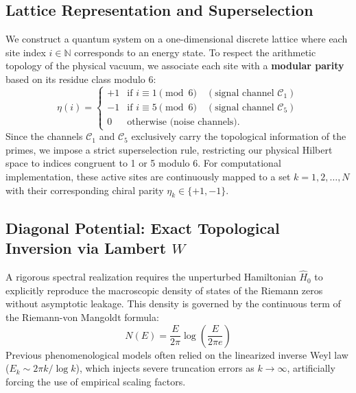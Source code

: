 \documentclass[prl,aps,floatfix,superscriptaddress,10pt]{revtex4-2}
\begin{document}
\subsection{Lattice Representation and Superselection}

We construct a quantum system on a one-dimensional discrete lattice where each site index $i \in \mathbb{N}$ corresponds to an energy state. To respect the arithmetic topology of the physical vacuum, we associate each site with a \textbf{modular parity} based on its residue class modulo 6:
\begin{equation}
\eta(i) = \begin{cases}
+1 & \text{if } i \equiv 1 \pmod 6 \quad (\text{signal channel } \mathcal{C}_1)\\
-1 & \text{if } i \equiv 5 \pmod 6 \quad (\text{signal channel } \mathcal{C}_5)\\
0 & \text{otherwise (noise channels)}.
\end{cases}
\end{equation}
Since the channels $\mathcal{C}_1$ and $\mathcal{C}_5$ exclusively carry the topological information of the primes, we impose a strict superselection rule, restricting our physical Hilbert space to indices congruent to 1 or 5 modulo 6. For computational implementation, these active sites are continuously mapped to a set $k = 1,2,\dots,N$ with their corresponding chiral parity $\eta_k \in \{+1,-1\}$.

\subsection{Diagonal Potential: Exact Topological Inversion via Lambert \texorpdfstring{$W$}{W}}

A rigorous spectral realization requires the unperturbed Hamiltonian $\hat{H}_0$ to explicitly reproduce the macroscopic density of states of the Riemann zeros without asymptotic leakage. This density is governed by the continuous term of the Riemann-von Mangoldt formula:
\begin{equation}
N(E) = \frac{E}{2\pi} \log\left(\frac{E}{2\pi e}\right)
\end{equation}
Previous phenomenological models often relied on the linearized inverse Weyl law ($E_k \sim 2\pi k / \log k$), which injects severe truncation errors as $k \to \infty$, artificially forcing the use of empirical scaling factors. 
\end{document}
